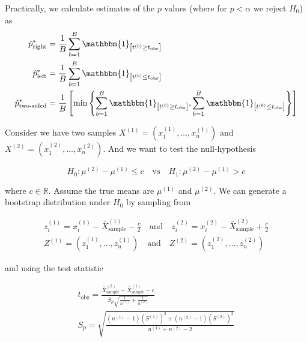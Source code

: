 Practically, we calculate estimates of the $p$ values (where for $p < \alpha$ we reject $H_0$) as
\begin{equation}
    \begin{aligned}
        \hat{p}^*_{\text{right}} &= \frac{1}{B} \sum_{b=1}^{B} \mathbbm{1}_{\left[t^{(b)} \geq t_{\text{obs}} \right]} \\
        \hat{p}^*_{\text{left}} &= \frac{1}{B} \sum_{b=1}^{B} \mathbbm{1}_{\left[t^{(b)} \leq t_{\text{obs}} \right]} \\
        \hat{p}^*_{\text{two-sided}} &= \frac{1}{B} \left[ \min{\left\{ \sum_{b=1}^{B} \mathbbm{1}_{\left[t^{(b)} \geq t_{\text{obs}} \right]}, \sum_{b=1}^{B} \mathbbm{1}_{\left[t^{(b)} \leq t_{\text{obs}} \right]} \right\} } \right]
    \end{aligned}
\end{equation}

Consider we have two samples $X^{(1)} = (x_1^{(1)},\dots,x_n^{(1)})$ and $X^{(2)} = (x_1^{(2)},\dots,x_n^{(2)})$. And we want to test the null-hypothesis

\begin{equation}
    H_0: \mu^{(2)} - \mu^{(1)} \leq c \quad \text{vs} \quad H_1: \mu^{(2)} - \mu^{(1)} > c
\end{equation}

where $c \in \mathbb{R}$. Assume the true means are $\mu^{(1)}$ and $\mu^{(2)}$. We can generate a
bootstrap distribution under $H_0$ by sampling from

\begin{equation}
    \begin{multlined}
        z^{(1)}_i = x^{(1)}_i - \bar{X}^{(1)}_{\text{sample}} - \frac{c}{2} \quad \text{and} \quad z^{(2)}_i = x^{(2)}_i - \bar{X}^{(2)}_{\text{sample}} + \frac{c}{2} \\   
        Z^{(1)} = (z_1^{(1)},\dots,z_n^{(1)}) \quad \text{and} \quad Z^{(2)} = (z_1^{(2)},\dots,z_n^{(2)})
    \end{multlined}
\end{equation}

and using the test statistic

\begin{equation}
    \begin{multlined}
    t_{\text{obs}} = \frac{\bar{X}^{(2)}_{\text{sample}} - \bar{X}^{(1)}_{\text{sample}} - c}{S_p\sqrt{\frac{1}{n^{(1)}} + \frac{1}{n^{(2)}}}} \\
    S_p = \sqrt{\frac{\left(n^{(1)} - 1\right)\left(S^{(1)}\right)^2 + \left(n^{(2)} - 1\right)\left(S^{(2)}\right)^2}{n^{(1)} + n^{(2)} - 2}} \\
    \end{multlined}
\end{equation}

